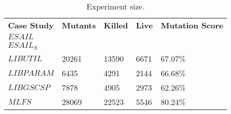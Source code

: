 
\begin{table}[htb]
\caption{Experiment size.}
\label{table:results:accuracy:full} 
\scriptsize
\centering
\begin{tabular}{|p{15mm}|p{10mm}|p{7mm}|p{7mm}|p{10mm}|}
\hline
\textbf{Case Study}&\textbf{Mutants}&\textbf{Killed}&\textbf{Live}&\textbf{Mutation Score}\\ 
$\mathit{ESAIL}$ &  &  &  &\\
$\mathit{ESAIL}_{S}$ &  &  &  &\\
$\mathit{LIBUTIL}$ &20261 & 13590 & 6671 & 67.07\% \\
$\mathit{LIBPARAM}$&6435&4291&2144&66.68\%\\
$\mathit{LIBGSCSP}$&7878&4905&2973&62.26\%\\
$\mathit{MLFS}$&28069&22523&5546&80.24\%\\
\hline
\end{tabular}

\end{table}